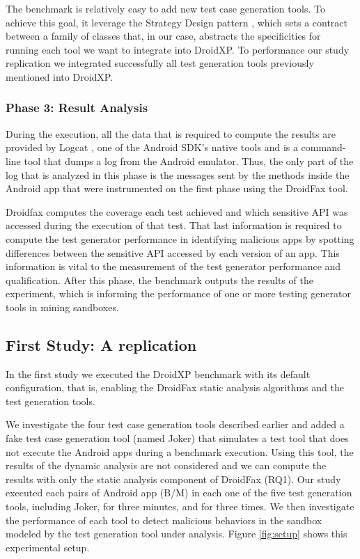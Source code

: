 The benchmark is relatively easy to add new test
case generation tools. To achieve this goal, it leverage the Strategy Design pattern \cite{patterns-book}, which sets a contract between a family of classes that, in our case, abstracts the specificities for running each tool we want to integrate into DroidXP. To performance our study replication we integrated successfully all test generation tools previously mentioned into DroidXP. 

\subsubsection{Phase 3: Result Analysis}

During the execution, all the data that is required to compute the results are provided by Logcat \cite{Logcat}, one of the Android SDK's native tools and is a command-line tool that dumps a log from the Android emulator. Thus, the only part of the log that is analyzed in this phase is the messages sent by the methods inside the Android app that were instrumented on the first phase using the DroidFax tool. 

Droidfax computes the coverage each test achieved and which sensitive API was accessed during the execution of that test. That last information is required to compute the test generator performance in identifying malicious apps by spotting differences between the sensitive API accessed by each version of an app. This information is vital to the measurement of the test generator performance and qualification. After this phase, the benchmark outputs the results of the experiment, which is informing the performance of one or more testing generator tools in mining sandboxes.

\subsection{First Study: A replication \blls}

In the first study we executed the DroidXP benchmark with its
default configuration, that is, enabling the DroidFax
static analysis algorithms and the test generation tools.

We investigate the four test case generation tools described earlier and added a fake test
case generation tool (named Joker) that simulates a test tool that does not execute
the Android apps during a benchmark execution. Using this tool, the results
of the dynamic analysis are not considered and we can compute the results with
only the static analysis component of DroidFax (RQ1). Our study executed each pairs of
Android app (B/M) in each one of the five test generation tools, including Joker,
for three minutes, and for three times. We then investigate the performance of each tool to detect malicious behaviors in the sandbox modeled by the test generation tool
under analysis. Figure \ref{fig:setup} shows this experimental setup.

